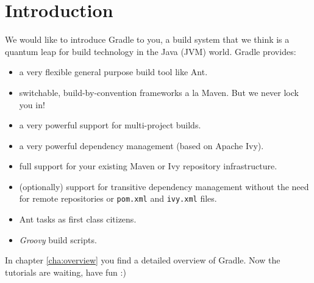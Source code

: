 \chapter{Introduction}
We would like to introduce Gradle to you, a build system that we think is a quantum leap for build technology in the Java (JVM) world. Gradle provides:
\begin{itemize}
	\item a very flexible general purpose build tool like Ant.
    \item switchable, build-by-convention frameworks a la Maven. But we never lock you in!
    \item a very powerful support for multi-project builds.
    \item a very powerful dependency management (based on Apache Ivy). 
    \item full support for your existing Maven or Ivy repository infrastructure.
	\item (optionally) support for transitive dependency management without the need for remote repositories or \texttt{pom.xml} and \texttt{ivy.xml} files.
    \item Ant tasks as first class citizens.
    \item \emph{Groovy} build scripts. 
\end{itemize}
In chapter \ref{cha:overview} you find a detailed overview of Gradle. Now the tutorials are waiting, have fun :)
